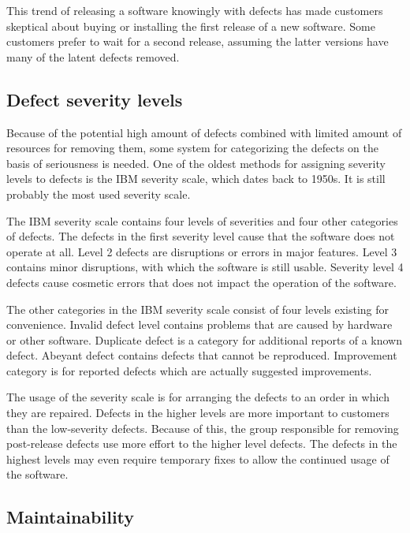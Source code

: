 This trend of releasing a software knowingly with defects has made customers skeptical about buying or installing the first release of a new software. Some customers prefer to wait for a second release, assuming the latter versions have many of the latent defects removed.


\subsection{Defect severity levels}

Because of the potential high amount of defects combined with limited amount of resources for removing them, some system for categorizing the defects on the basis of seriousness is needed. One of the oldest methods for assigning severity levels to defects is the IBM severity scale, which dates back to 1950s. It is still probably the most used severity scale.

The IBM severity scale contains four levels of severities and four other categories of defects. The defects in the first severity level cause that the software does not operate at all. Level 2 defects are disruptions or errors in major features. Level 3 contains minor disruptions, with which the software is still usable. Severity level 4 defects cause cosmetic errors that does not impact the operation of the software.

The other categories in the IBM severity scale consist of four levels existing for convenience. Invalid defect level contains problems that are caused by hardware or other software. Duplicate defect is a category for additional reports of a known defect. Abeyant defect contains defects that cannot be reproduced. Improvement category is for reported defects which are actually suggested improvements.

The usage of the severity scale is for arranging the defects to an order in which they are repaired. Defects in the higher levels are more important to customers than the low-severity defects. Because of this, the group responsible for removing post-release defects use more effort to the higher level defects. The defects in the highest levels may even require temporary fixes to allow the continued usage of the software.


\subsection{Maintainability}

